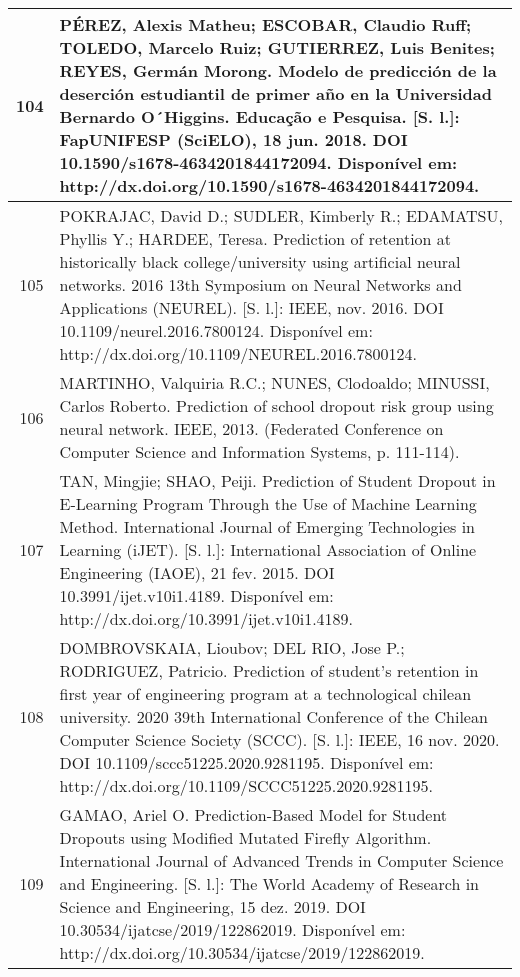 \begin{apendicesenv}
\begin{longtable}[c]{|r|l|}
104 &
  \multicolumn{1}{p{14.5cm}|}{PÉREZ, Alexis Matheu; ESCOBAR, Claudio Ruff; TOLEDO, Marcelo Ruiz; GUTIERREZ, Luis Benites; REYES, Germán Morong. Modelo de predicción de la deserción estudiantil de primer año en la Universidad Bernardo O´Higgins. Educação e Pesquisa. {[}S. l.{]}: FapUNIFESP (SciELO), 18 jun. 2018. DOI 10.1590/s1678-4634201844172094. Disponível em: http://dx.doi.org/10.1590/s1678-4634201844172094.} \\ \hline
105 &
  \multicolumn{1}{p{14.5cm}|}{POKRAJAC, David D.; SUDLER, Kimberly R.; EDAMATSU, Phyllis Y.; HARDEE, Teresa. Prediction of retention at historically black college/university using artificial neural networks. 2016 13th Symposium on Neural Networks and Applications (NEUREL). {[}S. l.{]}: IEEE, nov. 2016. DOI 10.1109/neurel.2016.7800124. Disponível em: http://dx.doi.org/10.1109/NEUREL.2016.7800124.} \\ \hline
106 &
  \multicolumn{1}{p{14.5cm}|}{MARTINHO, Valquiria R.C.; NUNES, Clodoaldo; MINUSSI, Carlos Roberto. Prediction of school dropout risk group using neural network. IEEE, 2013. (Federated Conference on Computer Science and Information Systems, p. 111-114).} \\ \hline
107 &
  \multicolumn{1}{p{14.5cm}|}{TAN, Mingjie; SHAO, Peiji. Prediction of Student Dropout in E-Learning Program Through the Use of Machine Learning Method. International Journal of Emerging Technologies in Learning (iJET). {[}S. l.{]}: International Association of Online Engineering (IAOE), 21 fev. 2015. DOI 10.3991/ijet.v10i1.4189. Disponível em: http://dx.doi.org/10.3991/ijet.v10i1.4189.} \\ \hline
108 &
  \multicolumn{1}{p{14.5cm}|}{DOMBROVSKAIA, Lioubov; DEL RIO, Jose P.; RODRIGUEZ, Patricio. Prediction of student’s retention in first year of engineering program at a technological chilean university. 2020 39th International Conference of the Chilean Computer Science Society (SCCC). {[}S. l.{]}: IEEE, 16 nov. 2020. DOI 10.1109/sccc51225.2020.9281195. Disponível em: http://dx.doi.org/10.1109/SCCC51225.2020.9281195.} \\ \hline
109 &
  \multicolumn{1}{p{14.5cm}|}{GAMAO, Ariel O. Prediction-Based Model for Student Dropouts using Modified Mutated Firefly Algorithm. International Journal of Advanced Trends in Computer Science and Engineering. {[}S. l.{]}: The World Academy of Research in Science and Engineering, 15 dez. 2019. DOI 10.30534/ijatcse/2019/122862019. Disponível em: http://dx.doi.org/10.30534/ijatcse/2019/122862019.} \\ \hline

\end{longtable}
\end{apendicesenv}
